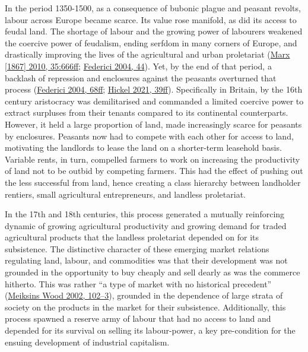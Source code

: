 \documentclass[a4paper, nobind]{templates/ociamthesis}
\begin{document}
In the period 1350-1500, as a consequence of bubonic plague and peasant revolts, labour across Europe became scarce. Its value rose manifold, as did its access to feudal land. The shortage of labour and the growing power of labourers weakened the coercive power of feudalism, ending serfdom in many corners of Europe, and drastically improving the lives of the agricultural and urban proletariat (\protect\hyperlink{ref-marx_capital_1867}{Marx {[}1867{]} 2010, 35:666ff}; \protect\hyperlink{ref-federici_caliban_2004}{Federici 2004, 44}). Yet, by the end of that period, a backlash of repression and enclosures against the peasants overturned that process (\protect\hyperlink{ref-federici_caliban_2004}{Federici 2004, 68ff}; \protect\hyperlink{ref-hickel_less_2021}{Hickel 2021, 39ff}). Specifically in Britain, by the 16th century aristocracy was demilitarised and commanded a limited coercive power to extract surpluses from their tenants compared to its continental counterparts. However, it held a large proportion of land, made increasingly scarce for peasants by enclosures. Peasants now had to compete with each other for access to land, motivating the landlords to lease the land on a shorter-term leasehold basis. Variable rents, in turn, compelled farmers to work on increasing the productivity of land not to be outbid by competing farmers. This had the effect of pushing out the less successful from land, hence creating a class hierarchy between landholder rentiers, small agricultural entrepreneurs, and landless proletariat.

In the 17th and 18th centuries, this process generated a mutually reinforcing dynamic of growing agricultural productivity and growing demand for traded agricultural products that the landless proletariat depended on for its subsistence. The distinctive character of these emerging market relations regulating land, labour, and commodities was that their development was not grounded in the opportunity to buy cheaply and sell dearly as was the commerce hitherto. This was rather ``a type of market with no historical precedent'' (\protect\hyperlink{ref-meiksins_wood_origin_2002}{Meiksins Wood 2002, 102--3}), grounded in the dependence of large strata of society on the products in the market for their subsistence. Additionally, this process spawned a reserve army of labour that had no access to land and depended for its survival on selling its labour-power, a key pre-condition for the ensuing development of industrial capitalism.
\end{document}
